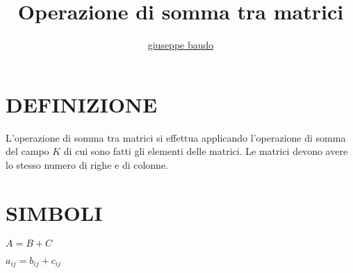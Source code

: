 \documentclass[a4paper,10pt]{article}
\title{Operazione di somma tra matrici}
\author{\href{http://www.baudo.hol.es}{giuseppe baudo}}
\begin{document}
\maketitle

\section{DEFINIZIONE}
L'operazione di somma tra matrici si effettua applicando l'operazione di somma del campo $K$ di cui sono fatti gli elementi delle matrici.
Le matrici devono avere lo stesso numero di righe e di colonne.

\section{SIMBOLI}
$A = B + C$

$a_{ij} = b_{ij} + c_{ij}$
\end{document}
